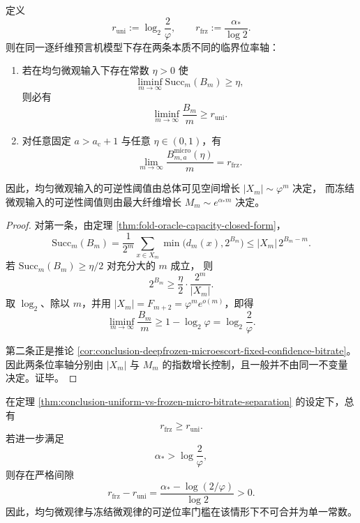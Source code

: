 \begin{theorem}[均匀微观律与冻结微观律的双阈值分离]\label{thm:conclusion-uniform-vs-frozen-micro-bitrate-separation}
定义
\[
r_{\mathrm{uni}}:=\log_2\frac{2}{\varphi},
\qquad
r_{\mathrm{frz}}:=\frac{\alpha_\ast}{\log 2}.
\]
则在同一逐纤维预言机模型下存在两条本质不同的临界位率轴：
\begin{enumerate}
  \item 若在均匀微观输入下存在常数 \(\eta>0\) 使
  \[
  \liminf_{m\to\infty}\mathrm{Succ}_m(B_m)\ge \eta,
  \]
  则必有
  \[
  \liminf_{m\to\infty}\frac{B_m}{m}\ge r_{\mathrm{uni}}.
  \]
  \item 对任意固定 \(a>a_{\mathrm c}+1\) 与任意 \(\eta\in(0,1)\)，有
  \[
  \lim_{m\to\infty}\frac{B_{m,a}^{\mathrm{micro}}(\eta)}{m}
  =
  r_{\mathrm{frz}}.
  \]
\end{enumerate}
因此，均匀微观输入的可逆性阈值由总体可见空间增长
\(|X_m|\sim \varphi^m\) 决定，
而冻结微观输入的可逆性阈值则由最大纤维增长
\(M_m\sim e^{\alpha_\ast m}\) 决定。
\end{theorem}
\begin{proof}
对第一条，由定理 \ref{thm:fold-oracle-capacity-closed-form}，
\[
\mathrm{Succ}_m(B_m)
=
\frac{1}{2^m}\sum_{x\in X_m}\min\bigl(d_m(x),2^{B_m}\bigr)
\le
|X_m|\,2^{B_m-m}.
\]
若 \(\mathrm{Succ}_m(B_m)\ge \eta/2\) 对充分大的 \(m\) 成立，
则
\[
2^{B_m}\ge \frac{\eta}{2}\cdot \frac{2^m}{|X_m|}.
\]
取 \(\log_2\)、除以 \(m\)，并用 \(|X_m|=F_{m+2}=\varphi^m e^{o(m)}\)，即得
\[
\liminf_{m\to\infty}\frac{B_m}{m}
\ge
1-\log_2\varphi
=
\log_2\frac{2}{\varphi}.
\]

第二条正是推论 \ref{cor:conclusion-deepfrozen-microescort-fixed-confidence-bitrate}。
因此两条位率轴分别由 \(|X_m|\) 与 \(M_m\) 的指数增长控制，且一般并不由同一不变量决定。证毕。
\end{proof}

\begin{corollary}[双阈值间隙的显式下界与严格分离条件]\label{cor:conclusion-uniform-frozen-micro-bitrate-gap-formula}
在定理 \ref{thm:conclusion-uniform-vs-frozen-micro-bitrate-separation} 的设定下，总有
\[
r_{\mathrm{frz}}\ge r_{\mathrm{uni}}.
\]
若进一步满足
\[
\alpha_\ast>\log\frac{2}{\varphi},
\]
则存在严格间隙
\[
r_{\mathrm{frz}}-r_{\mathrm{uni}}
=
\frac{\alpha_\ast-\log(2/\varphi)}{\log 2}
>0.
\]
因此，均匀微观律与冻结微观律的可逆位率门槛在该情形下不可合并为单一常数。
\end{corollary}

